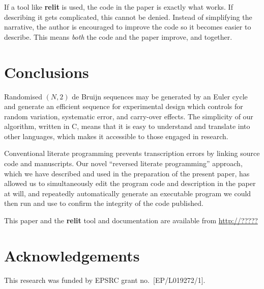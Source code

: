 \documentclass[12pt]{article}
\def\name#1{\textbf{#1}}
\begin{document}
If a tool like \name{relit} is used, the code in the paper is exactly what works. If describing it gets complicated, this cannot be denied. Instead of simplifying the narrative, the author is encouraged to improve the code so it becomes easier to describe. This means \emph{both\/} the code and the paper improve, and together.

\section{Conclusions}
Randomised $(N,2)$ de Bruijn sequences may be generated by an Euler cycle and generate an efficient sequence for experimental design which controls for random variation, systematic error, and carry-over effects. The simplicity of our algorithm, written in C, means that it is easy to understand and translate into other languages, which makes it accessible to those engaged in research. 

Conventional literate programming prevents transcription errors by linking source code and manuscripts. Our novel ``reversed literate programming'' approach, which we have described and used in the preparation of the present paper, has allowed us to simultaneously edit the program code and description in the paper at will, and repeatedly automatically generate an executable program we could then run and use to confirm the integrity of the code published.

This paper and the \name{relit} tool and documentation are available from \url{http://?????}



\section*{Acknowledgements}
This research was funded by EPSRC grant no.~[EP/L019272/1].

\let\oldbibitem=\bibitem
\def\bibitem{\frenchspacing\raggedright\oldbibitem}


\end{document}
